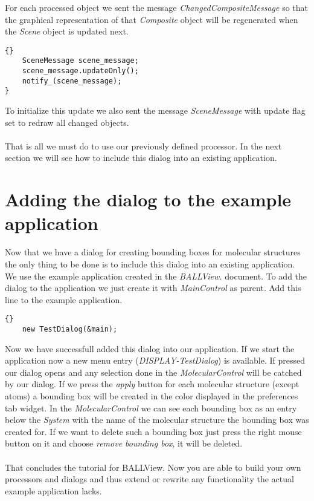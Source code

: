 For each processed object we sent the message {\em ChangedCompositeMessage} so
that the graphical representation of that {\em Composite} object will be regenerated
when the {\em Scene} object is updated next.			

\begin{lstlisting}{}
	SceneMessage scene_message;
	scene_message.updateOnly();
	notify_(scene_message);
}
\end{lstlisting}

To initialize this update we also sent the message {\em SceneMessage} with 
update flag set to redraw all changed objects.\\ \\

That is all we must do to use our previously defined processor. In the next section
we will see how to include this dialog into an existing application.



\section{Adding the dialog to the example application}
\label{section:adding_the_dialog}

Now that we have a dialog for creating bounding boxes for molecular structures
the only thing to be done is to include this dialog into an existing application.
We use the example application created in the {\em BALLView.} document.
To add the dialog to the application we just create it with {\em MainControl}
as parent. Add this line to the example application.

\begin{lstlisting}{}
	new TestDialog(&main);
\end{lstlisting}

Now we have successfull added this dialog into our application. If we start the
application now a new menu entry ({\em DISPLAY-TestDialog}) is available. If pressed our dialog opens and
any selection done in the {\em MolecularControl} will be catched by our dialog. If we press
the {\em apply} button for each molecular structure (except atoms) a bounding box
will be created in the color displayed in the preferences tab widget. In the {\em MolecularControl}
we can see each bounding box as an entry below the {\em System} with the name of
the molecular structure the bounding box was created for.
If we want to delete such a bounding box just press the right mouse button on it and
choose {\em remove bounding box}, it will be deleted.\\ \\

That concludes the tutorial for BALLView. Now you are able to build your own
processors and dialogs and thus extend or rewrite any functionality the actual
example application lacks.
